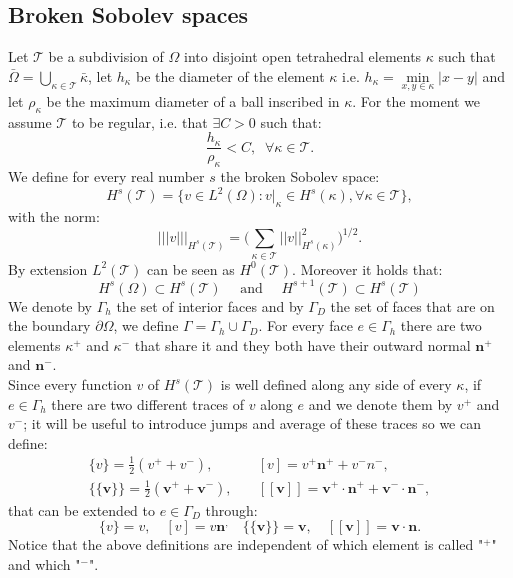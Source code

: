 \documentclass[12pt, a4paper]{article}
\theoremstyle{definition}
\theoremstyle{plain}
\theoremstyle{plain}
\begin{document}
\subsection{Broken Sobolev spaces}
Let $\mathcal{T}$ be a subdivision of $\Omega$ into disjoint open tetrahedral elements $\kappa$ such that $\bar{\Omega} = \bigcup\limits_{\kappa \in \mathcal{T}} \bar{\kappa}$, let $h_\kappa$ be the diameter of the element $\kappa$ i.e. $h_\kappa = \min\limits_{x, y \in \kappa} |x-y|$ and let $\rho_\kappa$ be the maximum diameter of a ball inscribed in $\kappa$. For the moment we assume $\mathcal{T}$ to be regular, i.e. that $\exists C > 0$ such that:
\begin{equation*}
	\frac{h_\kappa}{\rho_\kappa} < C, \; \; \forall \kappa \in \mathcal{T}.
\end{equation*}
We define for every real number $s$ the broken Sobolev space:
\begin{equation*}
	H^s(\mathcal{T}) = \{ v \in L^2(\Omega) : v|_\kappa \in H^s(\kappa), \forall \kappa \in \mathcal{T} \},
\end{equation*}
with the norm:
\begin{equation*}
	|\!|\!|v|\!|\!|_{H^s(\mathcal{T})} = \bigg( \sum_{\kappa \in \mathcal{T}} |\!|v|\!|_{H^s(\kappa)}^2 \bigg)^{1/2}.
\end{equation*}
By extension $L^2(\mathcal{T})$ can be seen as $H^0(\mathcal{T})$. Moreover it holds that:
\begin{equation*}
	H^s(\Omega) \subset H^s(\mathcal{T}) \quad \text{ and } \quad H^{s+1}(\mathcal{T}) \subset H^s(\mathcal{T})
\end{equation*}
We denote by $\Gamma_h$ the set of interior faces and by $\Gamma_D$ the set of faces that are on the boundary $\partial \Omega$, we define $\Gamma = \Gamma_h \cup \Gamma_D$. For every face $e \in \Gamma_h$ there are two elements $\kappa^+$ and $\kappa^-$ that share it and they both have their outward normal $\mathbf{n}^+$ and $\mathbf{n}^-$.\\
Since every function $v$ of $H^s(\mathcal{T})$ is well defined along any side of every $\kappa$, if $e \in \Gamma_h$ there are two different traces of $v$ along $e$ and we denote them by $v^+$ and $v^-$; it will be useful to introduce jumps and average of these traces so we can define:
\begin{align*}
	\{v\} = \frac{1}{2} (v^+ + v^-) ,
	& \quad [v] = v^+ \mathbf{n}^+ + v^- {n}^-,\\
	\{\!\!\{ \mathbf{v} \}\!\!\} = \frac{1}{2} (\mathbf{v}^+ +\mathbf{v}^-),
	& \quad [\![ \mathbf{v} ]\!] = \mathbf{v}^+ \cdot \mathbf{n}^+ + \mathbf{v}^- \cdot \mathbf{n}^-,
\end{align*}
that can be extended to $e \in \Gamma_D$ through:
\begin{equation*}
	\{v\} = v, \quad [v] = v \mathbf{n}^,
	\quad \{\!\!\{ \mathbf{v} \}\!\!\} = \mathbf{v}, \quad [\![ \mathbf{v} ]\!] = \mathbf{v} \cdot \mathbf{n}.
\end{equation*}
Notice that the above definitions are independent of which element is called "$^+$" and which "$^-$".
\end{document}
